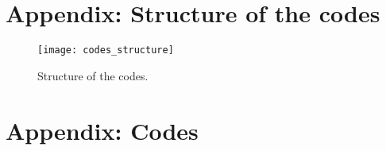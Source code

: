 \documentclass{article}
\begin{document}
\newpage
\newcommand{\doi}[1]{DOI: \href{http://dx.doi.org/#1}{\nolinkurl{#1}}}




\newpage
\appendix
\section{Appendix: Structure of the codes}

\begin{figure}[!h]
\begin{center}
\texttt{[image: codes\_structure]}
\end{center}
\caption{\label{fig:codes-structure} Structure of the codes.}
\end{figure}

\section{Appendix: Codes}
\end{document}
